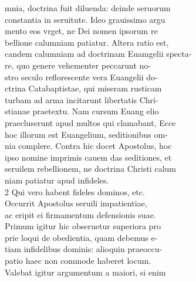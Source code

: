 \documentclass{article}
\begin{document}
\begin{pages}
                mnia, doctrina fuit diluenda: deinde seruorum \\
                constantia in seruitute. Ideo grauissimo argu \\
                mento eos vrget, ne Dei nomen ipsorum re \\
                bellione calumniam patiatur. Altera ratio est, \\
                candem calumniam ad doctrinam Euamgelii specta- \\
                re, quo genere vehementer peccarunt no- \\
                stro seculo reflorescente vera Euangelii do- \\
                ctrina Catabaptistae, qui miseram rusticam \\
                turbam ad arma incitarunt libertatis Chri- \\
                stianae praetextu. Nam cursum Euang elio \\
                praecluserunt apud multos qui clamabant, Ecce \\
                hoc illorum est Euangelium, seditionibus om- \\
                nia complere. Contra hic docet Apostolus, hoc \\
                ipso nomine imprimis cauem das seditiones, et \\
                seruilem rebellionem, ne doctrina Christi calum \\
                niam patiatur apud infideles. \\
                2 Qui vero habent fideles dominos, etc. \\
                Occurrit Apostolus seruili impatientiae, \\
                ac eripit ei firmamentum defensionis suae. \\
                Primum igitur hic obseruetur superiora pro \\
                prie loqui de obedientia, quam debemus e- \\
                tiam infidelibus dominis: alioquin praeoccu- \\
                patio haec non commode haberet locum. \\
                Valebat igitur argumentum a maiori, si enim \\

\end{pages}
\end{document}
